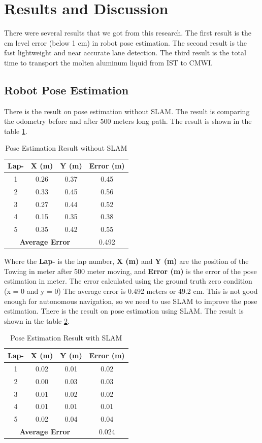 \documentclass[conference]{IEEEtran}
\begin{document}
\section{Results and Discussion} 
There were several results that we got from this research. The first result is the cm level error (below 1 cm) in robot pose estimation. The second result is the fast lightweight and near accurate lane detection. The third result is the total time to transport the molten aluminum liquid from IST to CMWI. 

\subsection{Robot Pose Estimation} 
There is the result on pose estimation without SLAM. The result is comparing the odometry before and after 500 meters long path. The result is shown in the table \ref{tab:pose_estimation}.
\begin{table}[H]
	\centering
	\caption{Pose Estimation Result without SLAM}
	\label{tab:pose_estimation}
	\begin{tabular}{|c|c|c|c|}
		\hline
		\textbf{Lap-} & \textbf{X (m)} & \textbf{Y (m)} & \textbf{Error (m)} \\ \hline
		1 & 0.26 & 0.37 & 0.45 \\ \hline
		2 & 0.33 & 0.45 & 0.56 \\ \hline
		3 & 0.27 & 0.44 & 0.52 \\ \hline
		4 & 0.15 & 0.35 & 0.38 \\ \hline
		5 & 0.35 & 0.42 & 0.55 \\ \hline
		\multicolumn{3}{|c|}{\textbf{Average Error}} & 0.492 \\ \hline
	\end{tabular}
\end{table}
Where the \textbf{Lap-} is the lap number, \textbf{X (m)} and \textbf{Y (m)} are the position of the Towing in meter after 500 meter moving, and \textbf{Error (m)} is the error of the pose estimation in meter. The error calculated using the ground truth zero condition (x = 0 and y = 0) The average error is 0.492 meters or 49.2 cm. This is not good enough for autonomous navigation, so we need to use SLAM to improve the pose estimation. There is the result on pose estimation using SLAM. The result is shown in the table \ref{tab:pose_estimation_slam}.
\begin{table}[H]
	\centering
	\caption{Pose Estimation Result with SLAM}
	\label{tab:pose_estimation_slam}
	\begin{tabular}{|c|c|c|c|}
		\hline
		\textbf{Lap-} & \textbf{X (m)} & \textbf{Y (m)} & \textbf{Error (m)} \\ \hline
		1 & 0.02 & 0.01 & 0.02 \\ \hline
		2 & 0.00 & 0.03 & 0.03 \\ \hline
		3 & 0.01 & 0.02 & 0.02 \\ \hline
		4 & 0.01 & 0.01 & 0.01 \\ \hline
		5 & 0.02 & 0.04 & 0.04 \\ \hline
		\multicolumn{3}{|c|}{\textbf{Average Error}} & 0.024 \\ \hline
	\end{tabular}
\end{table}
\end{document}
